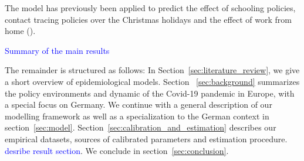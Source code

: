 The model has previously been applied to predict the effect of schooling policies,
contact tracing policies over the Christmas holidays and the effect of work from home
(\citet{Dorn2020a, Gabler2020, Gabler2021}).


\textcolor{blue}{Summary of the main results}

The remainder is structured as follows: In Section~\ref{sec:literature_review}, we give
a short overview of epidemiological models. Section ~\ref{sec:background} summarizes the
policy environments and dynamic of the Covid-19 pandemic in Europe, with a special focus
on Germany. We continue with a general description of our modelling framework  as well
as a specialization to the German context in section~\ref{sec:model}.
Section~\ref{sec:calibration_and_estimation} describes our empirical datasets, sources
of calibrated parameters and estimation procedure. \textcolor{blue}{desribe result
section}. We conclude in section~\ref{sec:conclusion}.
